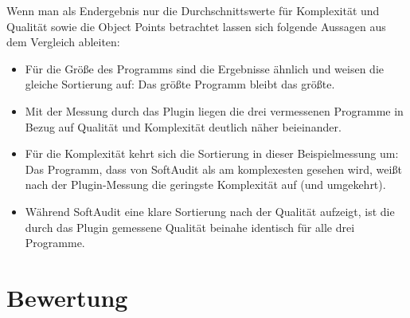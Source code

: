 \documentclass[gb,ngerman]{stthesis}
\begin{document}
			\newline Wenn man als Endergebnis nur die Durchschnittswerte für Komplexität und Qualität sowie die Object Points betrachtet lassen sich folgende Aussagen aus dem Vergleich ableiten:
			\begin{itemize}
			\item Für die Größe des Programms sind die Ergebnisse ähnlich und weisen die gleiche Sortierung auf: Das größte Programm bleibt das größte.
				\item Mit der Messung durch das Plugin liegen die drei vermessenen Programme in Bezug auf Qualität und Komplexität deutlich näher beieinander.
				\item Für die Komplexität kehrt sich die Sortierung in dieser Beispielmessung um: Das Programm, dass von SoftAudit als am komplexesten gesehen wird, weißt nach der Plugin-Messung die geringste Komplexität auf (und umgekehrt).
				\item Während SoftAudit eine klare Sortierung nach der Qualität aufzeigt, ist die durch das Plugin gemessene Qualität beinahe identisch für alle drei Programme.
			\end{itemize}
	\chapter{Bewertung}
\end{document}
